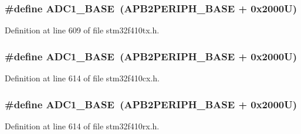 \subsubsection[{\texorpdfstring{A\+D\+C1\+\_\+\+B\+A\+SE}{ADC1_BASE}}]{\setlength{\rightskip}{0pt plus 5cm}\#define A\+D\+C1\+\_\+\+B\+A\+SE~({\bf A\+P\+B2\+P\+E\+R\+I\+P\+H\+\_\+\+B\+A\+SE} + 0x2000\+U)}\hypertarget{group___peripheral__registers__structures_ga695c9a2f892363a1c942405c8d351b91}{}\label{group___peripheral__registers__structures_ga695c9a2f892363a1c942405c8d351b91}


Definition at line 609 of file stm32f410tx.\+h.

\subsubsection[{\texorpdfstring{A\+D\+C1\+\_\+\+B\+A\+SE}{ADC1_BASE}}]{\setlength{\rightskip}{0pt plus 5cm}\#define A\+D\+C1\+\_\+\+B\+A\+SE~({\bf A\+P\+B2\+P\+E\+R\+I\+P\+H\+\_\+\+B\+A\+SE} + 0x2000\+U)}\hypertarget{group___peripheral__registers__structures_ga695c9a2f892363a1c942405c8d351b91}{}\label{group___peripheral__registers__structures_ga695c9a2f892363a1c942405c8d351b91}


Definition at line 614 of file stm32f410cx.\+h.

\subsubsection[{\texorpdfstring{A\+D\+C1\+\_\+\+B\+A\+SE}{ADC1_BASE}}]{\setlength{\rightskip}{0pt plus 5cm}\#define A\+D\+C1\+\_\+\+B\+A\+SE~({\bf A\+P\+B2\+P\+E\+R\+I\+P\+H\+\_\+\+B\+A\+SE} + 0x2000\+U)}\hypertarget{group___peripheral__registers__structures_ga695c9a2f892363a1c942405c8d351b91}{}\label{group___peripheral__registers__structures_ga695c9a2f892363a1c942405c8d351b91}


Definition at line 614 of file stm32f410rx.\+h.

